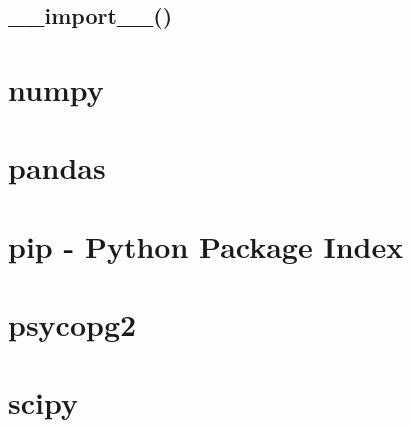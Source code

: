 \documentclass{article}
\begin{document}
\subsection{\_\_import\_\_()}
%

\section{numpy}


\section{pandas}

\section{pip - Python Package Index}


\section{psycopg2}

\section{scipy}

\newpage



\end{document}
